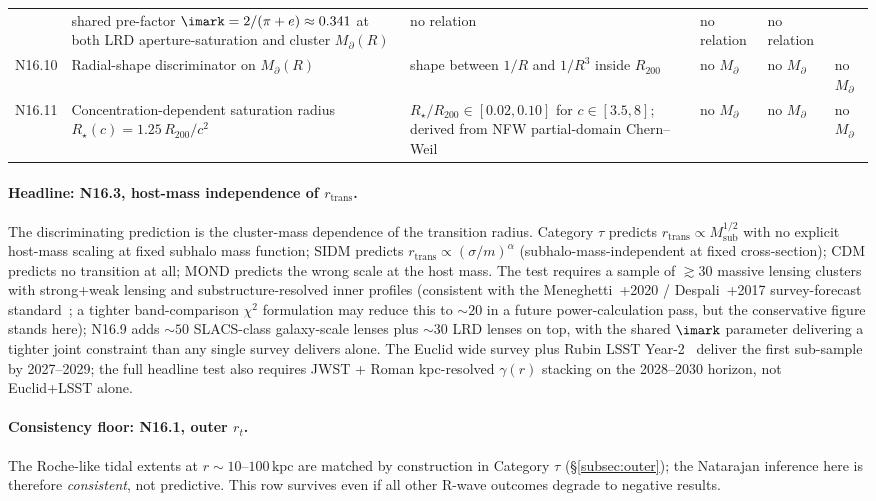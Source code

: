 \documentclass{pantarhei-researchnote}
\newcommand{\Mpa}{M_{\partial}}                 %
\newcommand{\Msub}{M_{\mathrm{sub}}}
\newcommand{\Rtwohun}{R_{200}}
\newcommand{\kpc}{\mathrm{kpc}}
\newcommand{\rtran}{r_{\mathrm{trans}}}
\newcommand{\falsifierID}[1]{\textsc{N16.#1}}
\begin{document}
\begin{table}[!t]
\begin{tabular}{@{}p{0.6cm} p{4.8cm} p{3.6cm} p{1.6cm} p{2.6cm} p{1.7cm}@{}}
  & shared pre-factor $\imark = 2/(\pi+e) \approx 0.341$ at both
    LRD aperture-saturation and cluster $\Mpa(R)$
  & no relation
  & no relation
  & no relation \\
\falsifierID{10} & Radial-shape discriminator on $\Mpa(R)$
  & shape between $1/R$ and $1/R^3$ inside $\Rtwohun$
  & no $\Mpa$
  & no $\Mpa$
  & no $\Mpa$ \\
\falsifierID{11} & Concentration-dependent saturation radius
    $R_\star(c) = 1.25\,\Rtwohun/c^2$
  & $R_\star/\Rtwohun \in [0.02, 0.10]$ for $c \in [3.5, 8]$;
    derived from NFW partial-domain Chern--Weil
  & no $\Mpa$
  & no $\Mpa$
  & no $\Mpa$ \\
\bottomrule
\end{tabular}
\end{table}

\paragraph{Headline: \falsifierID{3}, host-mass independence of $\rtran$.}
The discriminating prediction is the cluster-mass dependence of the
transition radius. Category $\tau$ predicts $\rtran \propto \Msub^{1/2}$
with no explicit host-mass scaling at fixed subhalo mass function; SIDM
predicts $\rtran \propto (\sigma/m)^\alpha$ (subhalo-mass-independent at
fixed cross-section); CDM predicts no transition at all; MOND predicts
the wrong scale at the host mass.
The test requires a sample of $\gtrsim 30$ massive lensing clusters
with strong+weak lensing and substructure-resolved inner profiles
(consistent with the Meneghetti~+2020 / Despali~+2017 survey-forecast
standard~\cite{Meneghetti2020}; a tighter band-comparison $\chi^2$
formulation may reduce this to $\sim 20$ in a future power-calculation
pass, but the conservative figure stands here); \falsifierID{9} adds
$\sim 50$ SLACS-class galaxy-scale lenses plus $\sim 30$ LRD lenses on
top, with the shared $\imark$ parameter delivering a tighter joint
constraint than any single survey delivers alone. The Euclid wide
survey plus Rubin LSST Year-2~\cite{EuclidRedbook2024,RubinLSST2025}
deliver the first sub-sample by 2027--2029; the full headline test
also requires JWST + Roman kpc-resolved $\gamma(r)$ stacking on the
2028--2030 horizon, not Euclid+LSST alone.

\paragraph{Consistency floor: \falsifierID{1}, outer $r_t$.}
The Roche-like tidal extents at $r \sim 10$--$100\,\kpc$ are matched by
construction in Category $\tau$ (\S\ref{subsec:outer}); the Natarajan
inference here is therefore \emph{consistent}, not predictive. This row
survives even if all other R-wave outcomes degrade to negative results.
\end{document}
